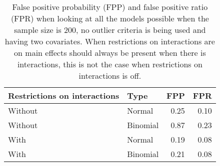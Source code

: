 \begin{longtable}{llrr}
\caption{False positive probability (FPP) and false positive ratio (FPR) when looking at all the models possible when the sample size is 200, no outlier criteria is being used and having two covariates. When restrictions on interactions are on main effects should always be present when there is interactions, this is not the case when restrictions on interactions is off.} \\ 
  \hline
Restrictions on interactions & Type & FPP & FPR \\ 
  \hline
Without & Normal & 0.25 & 0.10 \\ 
  Without & Binomial & 0.87 & 0.23 \\ 
  With & Normal & 0.19 & 0.08 \\ 
  With & Binomial & 0.21 & 0.08 \\ 
   \hline
\hline
\end{longtable}
